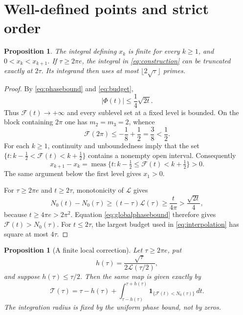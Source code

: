 \documentclass[11pt]{article}
\numberwithin{equation}{section}
\newtheorem{proposition}[theorem]{Proposition}
\theoremstyle{remark}
\newcommand{\NO}{N_0}
\newcommand{\LL}{\mathcal L}
\newcommand{\Fc}{\mathscr F}
\newcommand{\Tc}{\mathscr T}
\newcommand{\Ind}{\mathbf 1}
\DeclareMathOperator{\meas}{meas}
\begin{document}
\section{Well-defined points and strict order}
\label{sec:order}
\begin{proposition}\label{prop:ordered}
The integral defining \(x_k\) is finite for every \(k\ge1\), and
\(0<x_k<x_{k+1}\). If \(\tau\ge2\pi e\), the integral in
\eqref{eq:construction} can be truncated exactly at \(2\tau\).
Its integrand then uses at most \(\lfloor2\sqrt{\tau}\rfloor\) primes.
\end{proposition}
\begin{proof}
By \eqref{eq:phasebound} and \eqref{eq:budget},
\begin{equation}
 |\Phi(t)|\le\frac14\sqrt{2t}.
 \label{eq:globalphasebound}
\end{equation}
Thus \(\Fc(t)\to+\infty\) and every sublevel set at a fixed level is
bounded. On the block containing \(2\pi\) one has \(m_2=m_3=2\), whence
\[
 \Fc(2\pi)\le-\frac18+\frac12=\frac38<\frac12.
\]
For each \(k\ge1\), continuity and unboundedness imply that the set
\(\{t:k-\tfrac12<\Fc(t)<k+\tfrac12\}\) contains a nonempty open interval.
Consequently
\[
 x_{k+1}-x_k
 =\meas\{t:k-\tfrac12\le\Fc(t)<k+\tfrac12\}>0.
\]
The same argument below the first level gives \(x_1>0\).

For \(\tau\ge2\pi e\) and \(t\ge2\tau\), monotonicity of \(\LL\) gives
\[
 \NO(t)-\NO(\tau)\ge(t-\tau)\LL(\tau)
       \ge \frac{t}{4\pi}>\frac{\sqrt{2t}}4,
\]
because \(t\ge4\pi e>2\pi^2\). Equation \eqref{eq:globalphasebound}
therefore gives \(\Fc(t)>\NO(\tau)\). For \(t\le2\tau\),
the largest budget used in \eqref{eq:interpolation} has square at most
\(4\tau\).
\end{proof}
\begin{proposition}[A finite local correction]\label{prop:localintegral}
Let \(\tau\ge2\pi e\), put
\[
 h(\tau)=\frac{\sqrt{\tau}}{2\LL(\tau/2)},
\]
and suppose \(h(\tau)\le\tau/2\). Then the same map is given exactly by
\begin{equation}
 \Tc(\tau)=\tau-h(\tau)+
 \int_{\tau-h(\tau)}^{\tau+h(\tau)}
       \Ind_{\{\Fc(t)<\NO(\tau)\}}\,dt .
 \label{eq:localintegral}
\end{equation}
The integration radius is fixed by the uniform phase bound, not by zeros.
\end{proposition}
\end{document}
